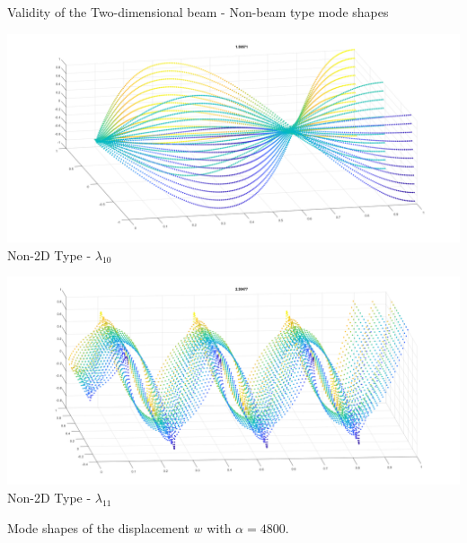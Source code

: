 \documentclass[8pt]{beamer}
\begin{document}
\begin{frame}{Validity of the Two-dimensional beam - Non-beam type mode shapes}
            \begin{minipage}[b]{0.45\textwidth}
                \includegraphics[width=\textwidth]{3DNonBeam10.png}
                \\ Non-2D Type - $\lambda_{10}$
                \label{fig:minipage8}
            \end{minipage}
            \hfill
            \begin{minipage}[b]{0.45\textwidth}
                \includegraphics[width=\textwidth]{3DNonBeam11.png}
                \\ Non-2D Type - $\lambda_{11}$
                \label{fig:minipage7}
            \end{minipage}
        
            Mode shapes of the displacement \( w \) with \( \alpha = 4800 \).
        \end{frame}
\end{document}
